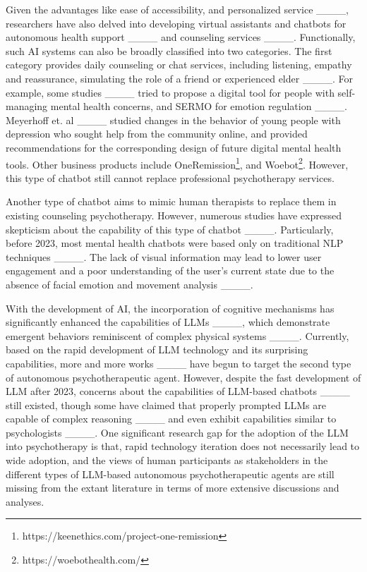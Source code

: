Given the advantages like ease of accessibility, and personalized service ____, researchers have also delved into developing virtual assistants and chatbots for autonomous health support ____ and counseling services ____. Functionally, such AI systems can also be broadly classified into two categories. The first category provides daily counseling or chat services, including listening, empathy and reassurance, simulating the role of a friend or experienced elder ____. For example, some studies ____ tried to propose a digital tool for people with self-managing mental health concerns, and SERMO for emotion regulation ____. Meyerhoff et. al ____ studied changes in the behavior of young people with depression who sought help from the community online, and provided recommendations for the corresponding design of future digital mental health tools. Other business products include OneRemission\footnote{https://keenethics.com/project-one-remission}, and Woebot\footnote{https://woebothealth.com/}. However, this type of chatbot still cannot replace professional psychotherapy services.

Another type of chatbot aims to mimic human therapists to replace them in existing counseling psychotherapy. However, numerous studies have expressed skepticism about the capability of this type of chatbot ____. Particularly, before 2023, most mental health chatbots were based only on traditional NLP techniques ____. The lack of visual information may lead to lower user engagement and a poor understanding of the user's current state due to the absence of facial emotion and movement analysis ____. 

With the development of AI, the incorporation of cognitive mechanisms has significantly enhanced the capabilities of LLMs ____, which demonstrate emergent behaviors reminiscent of complex physical systems ____. Currently, based on the rapid development of LLM technology and its surprising capabilities, more and more works ____ have begun to target the second type of autonomous psychotherapeutic agent. However, despite the fast development of LLM after 2023, concerns about the capabilities of LLM-based chatbots ____ still existed, though some have claimed that properly prompted LLMs are capable of complex reasoning ____ and even exhibit capabilities similar to psychologists ____. One significant research gap for the adoption of the LLM into psychotherapy is that, rapid technology iteration does not necessarily lead to wide adoption, and the views of human participants as stakeholders in the different types of LLM-based autonomous psychotherapeutic agents are still missing from the extant literature in terms of more extensive discussions and analyses.




